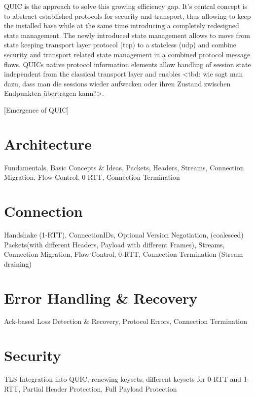 QUIC is the approach to solve this growing efficiency gap. It’s central concept is to abstract established protocols for security and transport, thus allowing to keep the installed base while at the same time introducing a completely redesigned state management. The newly introduced state management allows to move from state keeping transport layer protocol (tcp) to a stateless (udp) and combine security and transport related state management in a combined protocol message flows. QUICs native protocol information elements allow handling of session state independent from the classical transport layer and enables <tbd: wie sagt man dazu, dass man die sessions wieder aufwecken oder ihren Zustand zwischen Endpunkten übertragen kann?>.

[Emergence of QUIC]

\section{Architecture}

Fundamentals, Basic Concepts \& Ideas, Packets, Headers, Streams, Connection Migration, Flow Control, 0-RTT, Connection Termination

\section{Connection}

Handshake (1-RTT), ConnectionIDs, Optional Version Negotiation, (coalesced) Packets(with different Headers, Payload with different Frames), Streams, Connection Migration, Flow Control, 0-RTT, Connection Termination (Stream draining)

\section{Error Handling \& Recovery}

Ack-based Loss Detection \& Recovery, Protocol Errors, Connection Termination

\section{Security}

TLS Integration into QUIC, renewing keysets, different keysets for 0-RTT and 1-RTT, Partial Header Protection, Full Payload Protection
